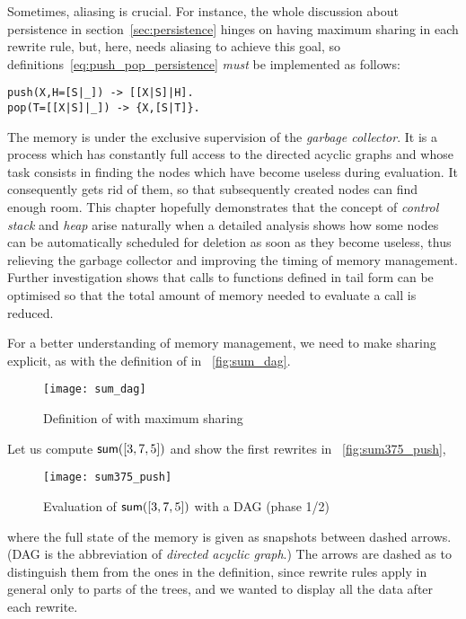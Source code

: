 Sometimes, aliasing is crucial. For instance, the whole discussion
about persistence in section~\ref{sec:persistence} hinges on having
maximum sharing in each rewrite rule, but, here, \Erlang needs
aliasing to achieve this goal, so
definitions~\eqref{eq:push_pop_persistence}
 \emph{must} be implemented as
follows:
\begin{verbatim}
push(X,H=[S|_]) -> [[X|S]|H].
pop(T=[[X|S]|_]) -> {X,[S|T]}.
\end{verbatim}


The memory is under the exclusive supervision of the \emph{garbage collector}. It is a process which has constantly full access to the directed acyclic graphs and whose task consists in finding the nodes which have become useless during evaluation. It consequently gets rid of them, so that subsequently created nodes can find enough room. This chapter hopefully demonstrates that the concept of \emph{control stack} and \emph{heap} arise naturally when a detailed analysis shows how some nodes can be automatically scheduled for deletion as soon as they become useless, thus relieving the garbage collector and improving the timing of memory management. Further investigation shows that calls to functions defined in tail form can be optimised so that the total amount of memory needed to evaluate a call is reduced.

For a better understanding of memory management, we need to make
sharing explicit, as with the definition of  in
\fig~\vref{fig:sum_dag}.
\begin{figure}
\centering
\texttt{[image: sum\_dag]}%
\caption{Definition of  with maximum sharing}
\label{fig:sum_dag}
\end{figure}
Let us compute \(\textsf{sum}([3,7,5])\) and show the first rewrites in
\fig~\vref{fig:sum375_push},
\begin{figure}[b]
\centering
\texttt{[image: sum375\_push]}
\caption{Evaluation of \(\textsf{sum}([3,7,5])\) with a DAG (phase 1/2)}
\label{fig:sum375_push}
\end{figure}
where the full state of the memory is given as snapshots between
dashed arrows. (DAG is the abbreviation of \emph{directed acyclic
  graph}.)  The arrows are dashed as to distinguish them from the ones in the definition, since rewrite rules apply in general only to parts of the trees, and we wanted to display all the data after each rewrite.

